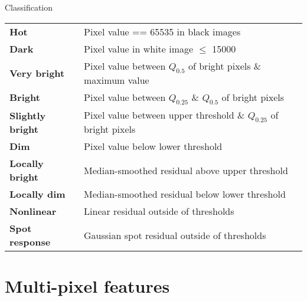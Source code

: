 \documentclass[8pt]{beamer}
\newcommand{\todo}[1]{
	\begin{minipage}{\textwidth}
	\begin{footnotesize}
	\textcolor{purple}{
					\begin{tabular}{p{0.01\textwidth}p{0.95\textwidth}}
						$\bullet$ & #1
					\end{tabular}
					}
	\end{footnotesize}
	\end{minipage}
}
\begin{document}
\begin{frame}{Classification} 

	
	\begin{tabular}{p{}p{}}
		\textbf{Hot} & Pixel value == 65535 in black images\\
		\textbf{Dark} & Pixel value in white image $\leq$ 15000\\
		\textbf{Very bright} & Pixel value between $Q_{0.5}$ of bright pixels \& maximum value\\
		\textbf{Bright} & Pixel value between $Q_{0.25}$ \& $Q_{0.5}$ of bright pixels\\
		\textbf{Slightly bright} & Pixel value between upper threshold \& $Q_{0.25}$ of bright pixels\\
		\textbf{Dim} & Pixel value below lower threshold\\
		\textbf{Locally bright} & Median-smoothed residual above upper threshold\\
		\textbf{Locally dim} & Median-smoothed residual below lower threshold\\
		\textbf{Nonlinear} & Linear residual outside of thresholds\\
		\textbf{Spot response} & Gaussian spot residual outside of thresholds
	\end{tabular}

\end{frame}



\section{Multi-pixel features}
\end{document}
